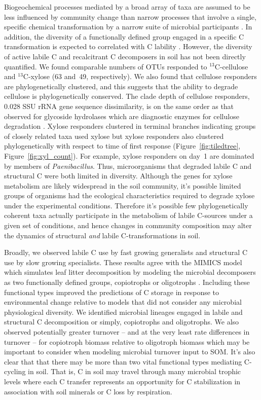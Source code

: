 Biogeochemical processes mediated by a broad array of taxa are assumed to
be less influenced by community change than narrow processes that involve
a single, specific chemical transformation by a narrow suite of microbial
participants \citep{Schimel_1995,McGuire2010}. In addition, the diversity of
a functionally defined group engaged in a specific C transformation is expected
to correlated with C lability \citep{McGuire2010}. However, the diversity of
active labile C and recalcitrant C decomposers in soil has not been directly
quantified. We found comparable numbers of OTUs responded to $^{13}$C-cellulose
and $^{13}$C-xylose (63 and~49, respectively). We also found that cellulose
responders are phylogenetically clustered, and this suggests that the ability
to degrade cellulose is phylogenetically conserved. The clade depth of
cellulose responders, 0.028 SSU rRNA gene sequence dissimilarity, is on the
same order as that observed for glycoside hydrolases which are diagnostic
enzymes for cellulose degradation \citep{Berlemont2013}. Xylose responders
clustered in terminal branches indicating groups of closely related taxa used
xylose but xylose responders also clustered phylogenetically with respect to
time of first response (Figure~\ref{fig:tiledtree},
Figure~\ref{fig:xyl_count}). For example, xylose responders on day~1 are
dominated by members of \textit{Paenibacillus}. Thus, microorganisms that
degraded labile C and structural C were both limited in diversity. Although the
genes for xylose metabolism are likely widespread in the soil community, it's
possible limited groups of organisms had the ecological characteristics
required to degrade xylose under the experimental conditions. Therefore it's
possible few phylogenetically coherent taxa actually participate in the
metabolism of labile C-sources under a given set of conditions, and hence
changes in community composition may alter the dynamics of structural
\textit{and} labile C-transformations in soil.

Broadly, we observed labile C use by fast growing generalists and structural
C use by slow growing specialists. These results agree with the MIMICS model
which simulates leaf litter decomposition by modeling the microbial decomposers
as two functionally defined groups, copiotrophs or oligotrophs
\citep{wieder_2014a}. Including these functional types improved the predictions
of C storage in response to environmental change relative to models that did
not consider any microbial physiological diversity. We identified microbial
lineages engaged in labile and structural C decomposition or simply,
copiotrophs and oligotrophs. We also observed potentially greater turnover --
and at the very least rate differences in turnover -- for copiotroph biomass
relative to oligotroph biomass which may be important to consider when modeling
microbial turnover input to SOM. It's also clear that that there may be more
than two vital functional types mediating C-cycling in soil. That is, C in soil
may travel through many microbial trophic levels where each C transfer
represents an opportunity for C stabilization in association with soil minerals
or C loss by respiration.

